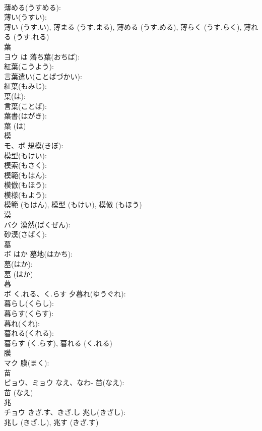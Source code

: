 \documentclass[8pt]{extreport}
\begin{document}
\begin{CJK}{UTF8}{min}
\\	薄める(うすめる): 
\\	薄い(うすい): 
\\	薄い (うす.い), 薄まる (うす.まる), 薄める (うす.める), 薄らく (うす.らく), 薄れる (うす.れる)
\\	葉			
\\	ヨウ	は	落ち葉(おちば): 
\\	紅葉(こうよう): 
\\	言葉遣い(ことばづかい): 
\\	紅葉(もみじ): 
\\	葉(は): 
\\	言葉(ことば): 
\\	葉書(はがき): 
\\	葉 (は)
\\	模			
\\	モ、ボ		規模(きぼ): 
\\	模型(もけい): 
\\	模索(もさく): 
\\	模範(もはん): 
\\	模倣(もほう): 
\\	模様(もよう): 
\\	模範 (もはん), 模型 (もけい), 模倣 (もほう)
\\	漠			
\\	バク		漠然(ばくぜん): 
\\	砂漠(さばく): 
\\	墓			
\\	ボ	はか	墓地(はかち): 
\\	墓(はか): 
\\	墓 (はか)
\\	暮			
\\	ボ	く.れる、く.らす	夕暮れ(ゆうぐれ): 
\\	暮らし(くらし): 
\\	暮らす(くらす): 
\\	暮れ(くれ): 
\\	暮れる(くれる): 
\\	暮らす (く.らす), 暮れる (く.れる)
\\	膜			
\\	マク		膜(まく): 
\\	苗			
\\	ビョウ、ミョウ	なえ、なわ-	苗(なえ): 
\\	苗 (なえ)
\\	兆			
\\	チョウ	きざ.す、きざ.し	兆し(きざし): 
\\	兆し (きざ.し), 兆す (きざ.す)

\end{CJK}
\end{document}
